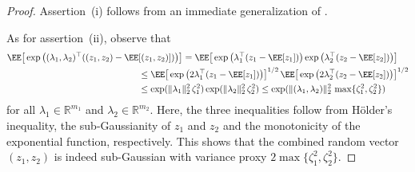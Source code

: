 \documentclass[11pt]{article}
\begin{document}
\begin{proof} Assertion~(i) follows from an immediate generalization of  \cite[Exercise~2.13]{wainwright2019high}.
    
As for assertion~(ii), observe that
\begin{align*}
    \EE\big[\exp\big((\lambda_1, \lambda_2)^\top  ((z_1,z_2)- \EE&[(z_1,z_2)])\big)\big] = \EE\big[\exp\big(\lambda_1^\top (z_1-\EE[z_1])\big)\exp\big(\lambda_2^\top(z_2-\EE[z_2])\big)\big]\\
    & \leq \EE\big[\exp\big(2\lambda_1^\top (z_1-\EE[z_1])\big)\big]^{1/2} \, \EE\big[\exp\big(2\lambda_2^\top(z_2-\EE[z_2])\big)\big]^{1/2}\\
    & \leq \exp(\|\lambda_1\|_2^2 \, \zeta_1^2)\exp(\|\lambda_2\|_2^2 \, \zeta_2^2 )\leq \exp(\|(\lambda_1,\lambda_2)\|_2^2 \, \max\{\zeta_1^2,\zeta_2^2\})
\end{align*}
for all $\lambda_1\in\mathbb R^{m_1}$ and $\lambda_2 \in\mathbb R^{m_2}$. Here, 
the three inequalities follow from Hölder's inequality, the sub-Gaussianity of $z_1$ and $z_2$ and the monotonicity of the exponential function, respectively. This shows that the combined random vector $(z_1,z_2)$ is indeed sub-Gaussian with variance proxy $2\max\{\zeta_1^2, \zeta_2^2\}$.


\end{proof}
\end{document}
